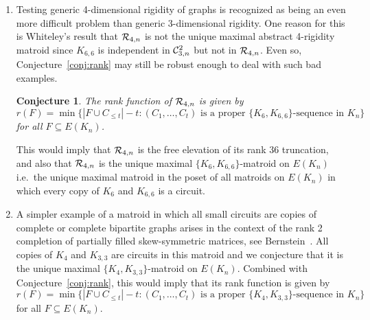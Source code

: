 \documentclass{daj}
\newtheorem{conjecture}[thm]{Conjecture}\theoremstyle{plain}
\begin{document}
\begin{enumerate}
\item Testing generic 4-dimensional rigidity of graphs is recognized as being an even more difficult problem than generic 3-dimensional rigidity. One reason for this is Whiteley's result that ${\cal R}_{4,n}$ is not the unique maximal abstract 4-rigidity matroid since
$K_{6,6}$
is independent in ${\cal C}_{3,n}^2$ but not in ${\cal R}_{4,n}$.
Even so, Conjecture~\ref{conj:rank} may still be robust enough to deal with such bad examples.

\begin{conjecture}\label{con:R4}
The rank function of ${\cal R}_{4,n}$ is given by
\[
r(F)=\min\{|F\cup C_{\leq t}|-t: (C_1,\dots, C_t) \text{ is a proper $\{K_6, K_{6,6}\}$-sequence in $K_n$} \}
\]
for all $F\subseteq E(K_n)$. 
\end{conjecture} 
This would imply that ${\cal R}_{4,n}$ is the free elevation of its rank 36 truncation, and also that ${\cal R}_{4,n}$ is  the unique maximal $\{K_6,K_{6,6}\}$-matroid on $E(K_n)$ i.e.~the unique maximal matroid in the poset of all matroids on $E(K_n)$ in which every copy of $K_6$ and $K_{6,6}$ is a  circuit.
%

\item A simpler example of a matroid in which all small circuits are copies of complete or complete bipartite graphs arises in the context of the rank 2  completion of partially filled skew-symmetric matrices, see Bernstein~\cite{B17}.
All copies of $K_4$ and $K_{3,3}$  are circuits in this matroid and we 
conjecture that 
it is  the unique maximal $\{K_4,K_{3,3}\}$-matroid on $E(K_n)$. Combined with Conjecture~\ref{conj:rank}, this would imply that 
its  rank function
  is given by
\[
r(F)=\min\{|F\cup C_{\leq t}|-t: (C_1,\dots, C_t) \text{ is a proper $\{K_4, K_{3,3}\}$-sequence in $K_n$} \}
\]
for all $F\subseteq E(K_n)$.
\end{enumerate}
\end{document}
